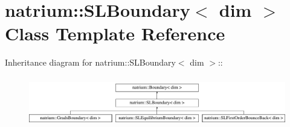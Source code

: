 \hypertarget{classnatrium_1_1SLBoundary}{
\section{natrium::SLBoundary$<$ dim $>$ Class Template Reference}
\label{classnatrium_1_1SLBoundary}
}
Inheritance diagram for natrium::SLBoundary$<$ dim $>$::\begin{figure}[H]
\begin{center}
\leavevmode
\includegraphics[height=2.19608cm]{classnatrium_1_1SLBoundary}
\end{center}
\end{figure}
